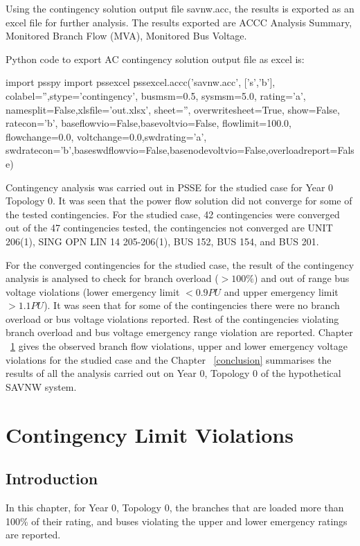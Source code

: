 \documentclass{report}
\begin{document}
Using the contingency solution output file savnw.acc, the results is exported as an excel file for further analysis. The results exported are ACCC Analysis Summary, Monitored Branch Flow (MVA), Monitored Bus Voltage.

Python code to export AC contingency solution output file as excel is: 

\begin{python}
import psspy
import pssexcel
pssexcel.accc('savnw.acc', ['s','b'], colabel='',stype='contingency', busmsm=0.5, sysmsm=5.0,
                rating='a', namesplit=False,xlsfile='out.xlsx', sheet='', overwritesheet=True, show=False, ratecon='b',
                baseflowvio=False,basevoltvio=False, flowlimit=100.0, flowchange=0.0, voltchange=0.0,swdrating='a',
                swdratecon='b',baseswdflowvio=False,basenodevoltvio=False,overloadreport=False)
\end{python}

Contingency analysis was carried out in PSSE for the studied case for Year 0 Topology 0. It was seen that the power flow solution did not converge for some of the tested contingencies. For the studied case, 42 contingencies were converged out of the 47 contingencies tested, the contingencies not converged are UNIT 206(1), SING OPN LIN   14 205-206(1), BUS 152, BUS 154, and BUS 201.

For the converged contingencies for the studied case, the result of the contingency analysis is analysed to check for branch overload ($ > 100\%$) and out of range bus voltage violations (lower emergency limit $ < 0.9 PU $ and upper emergency limit $ > 1.1 PU$). It was seen that for some of the contingencies there were no branch overload or bus voltage violations reported. Rest of the contingencies violating branch overload and bus voltage emergency range violation are reported. Chapter ~\ref{violations} gives the observed branch flow violations, upper and lower emergency voltage violations for the studied case and the Chapter ~\ref{conclusion} summarises the results of all the analysis carried out on Year 0, Topology 0 of the hypothetical SAVNW system. 


\chapter{Contingency Limit Violations}
\label{violations}
\section{Introduction}
In this chapter, for Year 0, Topology 0, the branches that are loaded more than 100\% of their rating, and buses violating the upper and lower emergency ratings are reported. 
\end{document}
